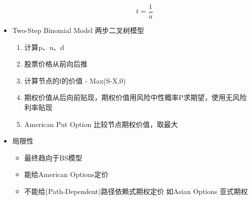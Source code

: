 \documentclass[a4paper,6pt,twoside,openany]{article}
\begin{document}
\begin{itemize}
\begin{itemize}
\begin{itemize}
$${{          t}} = \frac{1}{u}$$
    \end{itemize}
  \end{itemize}
\item Two-Step Binomial Model 两步二叉树模型
  \begin{enumerate}
  \item 计算p、u、d
  \item 股票价格从前向后推
  \item 计算节点的f的价值 - Max(S-X,0)
  \item 期权价值从后向前贴现，期权价值用风险中性概率P求期望，使用无风险利率贴现
  \item American Put Option 比较节点期权价值，取最大
  \end{enumerate}
\item 局限性
  \begin{itemize}
  \item 最终趋向于BS模型
  \item 能给American Options定价
  \item 不能给(Path-Dependent)路径依赖式期权定价 如Asian Options 亚式期权
  \end{itemize}
\end{itemize}
\end{document}

